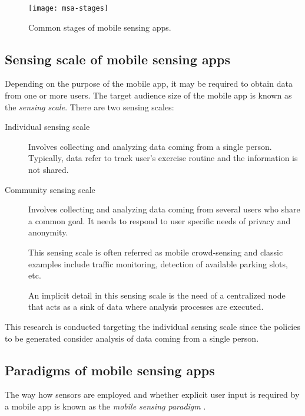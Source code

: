 \begin{figure}
\centering
\texttt{[image: msa-stages]}
\caption[Common stages of mobile sensing apps]{Common stages of mobile sensing apps.}
\label{fig-mobile-sensing-apps-stages}
\end{figure}

\subsection{Sensing scale of mobile sensing apps}\label{sub:sensing-scale-of-msa}

Depending on the purpose of the mobile app, it may be required to obtain data from one or more users.
The target audience size of the mobile app is known as the \emph{sensing scale}.
There are two sensing scales:
\begin{description}
  \item[Individual sensing scale] Involves collecting and analyzing data coming from a single person.
  Typically, data refer to track user’s exercise routine and the information is not shared.

  \item[Community sensing scale] Involves collecting and analyzing data coming from several users who share a common goal.
  It needs to respond to user specific needs of privacy and anonymity.
  
  This sensing scale is often referred as mobile crowd-sensing and classic examples include traffic monitoring, detection of available parking slots, etc.

  An implicit detail in this sensing scale is the need of a centralized node that acts as a sink of data where analysis processes are executed.
\end{description}

This research is conducted targeting the individual sensing scale since the policies to be generated consider analysis of data coming from a single person.


\subsection{Paradigms of mobile sensing apps}\label{sub:paradigms-of-msa}

The way how sensors are employed and whether explicit user input is required by a mobile app is known as the \emph{mobile sensing paradigm} \cite{Lane2010}.


